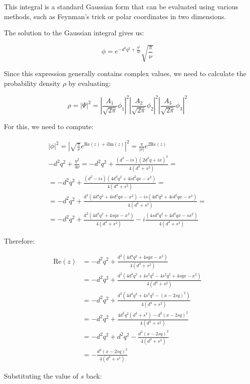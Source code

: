 \documentclass[italian]{HKNdocument}
\begin{document}
This integral is a standard Gaussian form that can be evaluated using various methods, such as Feynman's trick or polar coordinates in two dimensions.


The solution to the Gaussian integral gives us:

\begin{equation}
\phi = e^{-d^2q^2+\frac{\eta^2}{4\nu}}\sqrt{\frac{\pi}{\nu}}
\end{equation}

Since this expression generally contains complex values, we need to calculate the probability density $\rho$ by evaluating:

\begin{equation}
\rho = |\Psi|^2 = \left|\frac{A_1}{\sqrt{2\pi}}\phi_1\right|^2\left|\frac{A_2}{\sqrt{2\pi}}\phi_2\right|^2\left|\frac{A_3}{\sqrt{2\pi}}\phi_3\right|^2
\end{equation}

For this, we need to compute:

\begin{gather}
|\phi|^2 = \left|\sqrt{\frac{\pi}{\nu}}e^{\text{Re}(z)+i\text{Im}(z)}\right|^2 = \frac{\pi}{|\nu|}e^{2\text{Re}(z)}  \\
-d^2q^2+\frac{\eta^2}{4\nu} = -d^2q^2+\frac{(d^2-is)(2d^2q+ix)^2}{4(d^4+s^2)} = \\
= -d^2q^2+\frac{(d^2-is)(4d^4q^2+4id^2qx-x^2)}{4(d^4+s^2)} = \\
= -d^2q^2+\frac{d^2(4d^4q^2+4id^2qx-x^2)-is(4d^4q^2+4id^2qx-x^2)}{4(d^4+s^2)} =  \\
= -d^2q^2+\frac{d^2(4d^4q^2+4sqx-x^2)}{4(d^4+s^2)}-i\frac{(4sd^4q^2+4d^4qx-sx^2)}{4(d^4+s^2)}
\end{gather}

Therefore:

\begin{align}
\text{Re}(z) &= -d^2q^2+\frac{d^2(4d^4q^2+4sqx-x^2)}{4(d^4+s^2)} \\
&= -d^2q^2+\frac{d^2(4d^4q^2+4s^2q^2-4s^2q^2+4sqx-x^2)}{4(d^4+s^2)} \\
&= -d^2q^2+\frac{d^2(4d^4q^2+4s^2q^2-(x-2sq)^2)}{4(d^4+s^2)} \\
&= -d^2q^2+\frac{4d^2q^2(d^4+s^2)-d^2(x-2sq)^2}{4(d^4+s^2)}  \\
&= -d^2q^2+d^2q^2-\frac{d^2(x-2sq)^2}{4(d^4+s^2)} \\
&= -\frac{d^2(x-2sq)^2}{4(d^4+s^2)}
\end{align}

Substituting the value of $s$ back:
\end{document}

